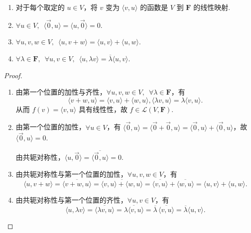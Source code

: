 \begin{enumerate}
    \item 对于每个取定的 $u \in V$，将 $ v $ 变为 $\langle v, u \rangle$ 的函数是 $ V $ 到 $\mathbf{F}$ 的线性映射.

    \item $\forall u \in V, \enspace \langle \vec{0}, u \rangle = \langle u, \vec{0} \rangle = 0$.

    \item $\forall u, v, w \in V, \enspace \langle u, v + w \rangle = \langle u, v \rangle + \langle u, w \rangle$.

    \item $\forall \lambda \in \mathbf{F}, \enspace \forall u, v \in V, \enspace \langle u, \lambda v \rangle = \overline{\lambda} \langle u, v \rangle$.
\end{enumerate}

\begin{proof}
    \begin{enumerate}
        \item 由第一个位置的加性与齐性，$\forall u, v, w \in V, \enspace \forall \lambda \in \mathbf{F}$，有
        \[
            \langle v + w, u \rangle = \langle v, u \rangle + \langle w, u \rangle, \langle \lambda v, u \rangle = \lambda \langle v, u \rangle.
        \]
        从而 $f(v)=\langle v, u \rangle$ 具有线性性，故 $f \in \mathcal{L}(V, \mathbf{F})$.
        \item 由第一个位置的加性，$\forall u \in V$，有 $\langle \vec{0}, u \rangle = \langle \vec{0} + \vec{0}, u \rangle = \langle \vec{0}, u \rangle + \langle \vec{0}, u \rangle$，故 $\langle \vec{0}, u \rangle = 0$.

        由共轭对称性，$\langle u, \vec{0} \rangle = \overline{\langle \vec{0}, u \rangle} = 0$.

        \item 由共轭对称性与第一个位置的加性，$\forall u, v, w \in V$，有
        \[
            \langle u, v + w \rangle = \overline{\langle v + w, u \rangle} = \overline{\langle v, u \rangle + \langle w, u \rangle} = \overline{\langle v, u \rangle} + \overline{\langle w, u \rangle} = \langle u, v\rangle + \langle u, w\rangle.
        \]

        \item 由共轭对称性与第一个位置的齐性，$\forall u, v\in V$，有
        \[
            \langle u, \lambda v\rangle =\overline{\langle\lambda v, u\rangle}=\overline{\lambda\langle v, u\rangle}=\overline{\lambda}\,\overline{\langle v, u\rangle}=\overline{\lambda}\langle u, v\rangle.
        \]
    \end{enumerate}
\end{proof}

